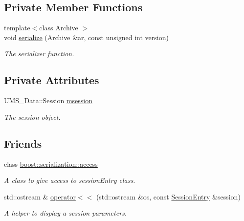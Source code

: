 \subsection*{Private Member Functions}
\begin{DoxyCompactItemize}
\item 
{\footnotesize template$<$class Archive $>$ }\\void \hyperlink{classSessionEntry_a55822664dec4de4fe28824d2765d9f96}{serialize} (Archive \&ar, const unsigned int version)
\begin{DoxyCompactList}\small\item\em The serializer function. \item\end{DoxyCompactList}\end{DoxyCompactItemize}
\subsection*{Private Attributes}
\begin{DoxyCompactItemize}
\item 
\hypertarget{classSessionEntry_aefc3f1ba7d834a21793d0bc02a7495c8}{
UMS\_\-Data::Session \hyperlink{classSessionEntry_aefc3f1ba7d834a21793d0bc02a7495c8}{msession}}
\label{classSessionEntry_aefc3f1ba7d834a21793d0bc02a7495c8}

\begin{DoxyCompactList}\small\item\em The session object. \item\end{DoxyCompactList}\end{DoxyCompactItemize}
\subsection*{Friends}
\begin{DoxyCompactItemize}
\item 
\hypertarget{classSessionEntry_ac98d07dd8f7b70e16ccb9a01abf56b9c}{
class \hyperlink{classSessionEntry_ac98d07dd8f7b70e16ccb9a01abf56b9c}{boost::serialization::access}}
\label{classSessionEntry_ac98d07dd8f7b70e16ccb9a01abf56b9c}

\begin{DoxyCompactList}\small\item\em A class to give access to sessionEntry class. \item\end{DoxyCompactList}\item 
std::ostream \& \hyperlink{classSessionEntry_a283f7dbafc8f05cebfbbc3b76dadf437}{operator$<$$<$} (std::ostream \&os, const \hyperlink{classSessionEntry}{SessionEntry} \&session)
\begin{DoxyCompactList}\small\item\em A helper to display a session parameters. \item\end{DoxyCompactList}\end{DoxyCompactItemize}


